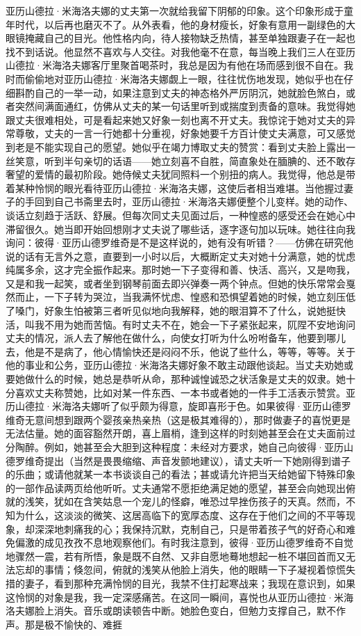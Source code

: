 \documentclass[12pt, UTF8]{ctexbook}
\begin{document}
\par 亚历山德拉·米海洛夫娜的丈夫第一次就给我留下阴郁的印象。这个印象形成于童年时代，以后再也磨灭不了。从外表看，他的身材瘦长，好象有意用一副绿色的大眼镜掩藏自己的目光。他性格内向，待人接物缺乏热情，甚至单独跟妻子在一起也找不到话说。他显然不喜欢与人交往。对我他毫不在意，每当晚上我们三人在亚历山德拉·米海洛夫娜客厅里聚首喝茶时，我总是因为有他在场而感到很不自在。我时而偷偷地对亚历山德拉·米海洛夫娜觑上一眼，往往忧伤地发现，她似乎也在仔细斟酌自己的一举一动，如果注意到丈夫的神态格外严厉阴沉，她就脸色煞白，或者突然间满面通红，仿佛从丈夫的某一句话里听到或揣度到责备的意味。我觉得她跟丈夫很难相处，可是看起来她又好象一刻也离不开丈夫。我惊诧于她对丈夫的异常尊敬，丈夫的一言一行她都十分重视，好象她要千方百计使丈夫满意，可又感觉到老是不能实现自己的愿望。她似乎在竭力博取丈夫的赞赏：看到丈夫脸上露出一丝笑意，听到半句亲切的话语——她立刻喜不自胜，简直象处在腼腆的、还不敢存奢望的爱情的最初阶段。她侍候丈夫犹同照料一个别扭的病人。我觉得，他总是带着某种怜悯的眼光看待亚历山德拉·米海洛夫娜，这使后者相当难堪。当他握过妻子的手回到自己书斋里去时，亚历山德拉·米海洛夫娜便整个儿变样。她的动作、谈话立刻趋于活跃、舒展。但每次同丈夫见面过后，一种惶惑的感受还会在她心中滞留很久。她当即开始回想刚才丈夫说了哪些话，逐字逐句加以玩味。她往往向我询问：彼得·亚历山德罗维奇是不是这样说的，她有没有听错？——仿佛在研究他说的话有无言外之意，直要到一小时以后，大概断定丈夫对她十分满意，她的忧虑纯属多余，这才完全振作起来。那时她一下子变得和善、快活、高兴，又是吻我，又是和我一起笑，或者坐到钢琴前面去即兴弹奏一两个钟点。但她的快乐常常会戛然而止，一下子转为哭泣，当我满怀忧虑、惶惑和恐惧望着她的时候，她立刻压低了嗓门，好象生怕被第三者听见似地向我解释，她的眼泪算不了什么，说她挺快活，叫我不用为她而苦恼。有时丈夫不在，她会一下子紧张起来，阢陧不安地询问丈夫的情况，派人去了解他在做什么，向使女打听为什么吩咐备车，他要到哪儿去，他是不是病了，他心情愉快还是闷闷不乐，他说了些什么，等等，等等。关于他的事业和公务，亚历山德拉·米海洛夫娜好象不敢主动跟他谈起。当丈夫劝她或要她做什么的时候，她总是恭听从命，那种诚惶诚恐之状活象是丈夫的奴隶。她十分喜欢丈夫称赞她，比如对某一件东西、一本书或者她的一件手工活表示赞赏。亚历山德拉·米海洛夫娜听了似乎颇为得意，旋即喜形于色。如果彼得·亚历山德罗维奇无意间想到跟两个婴孩亲热亲热（这是极其难得的），那时做妻子的喜悦更是无法估量。她的面容豁然开朗，喜上眉梢，逢到这样的时刻她甚至会在丈夫面前过分陶醉。例如，她甚至会大胆到这种程度：未经对方要求，她自己向彼得·亚历山德罗维奇提出（当然是畏畏缩缩、声音发颤地建议），请丈夫听一下她刚得到谱子的乐曲；或请他就某一本书谈谈自己的看法；甚或请允许把当天给她留下特殊印象的一部作品读两页给他听听。丈夫通常不愿拒绝满足她的愿望，甚至会向她现出俯就的浅笑，犹如在含笑姑息一个宠儿的怪癖，唯恐过早挫伤孩子的天真。然而，不知为什么，这淡淡的微笑、这居高临下的宽厚态度、这存在于他们之间的不平等现象，却深深地刺痛我的心；我保持沉默，克制自己，只是带着孩子气的好奇心和难免偏激的成见孜孜不息地观察他们。有时我注意到，彼得·亚历山德罗维奇不自觉地骤然一震，若有所悟，象是既不自然、又非自愿地蓦地想起一桩不堪回首而又无法忘却的事情；倏忽间，俯就的浅笑从他脸上消失，他的眼睛一下子凝视着惊慌失措的妻子，看到那种充满怜悯的目光，我禁不住打起寒战来；我现在意识到，如果这怜悯的对象是我，我一定深感痛苦。在这同一瞬间，喜悦也从亚历山德拉·米海洛夫娜脸上消失。音乐或朗读顿告中断。她脸色变白，但勉力支撑自己，默不作声。那是极不愉快的、难捱
\end{document}
